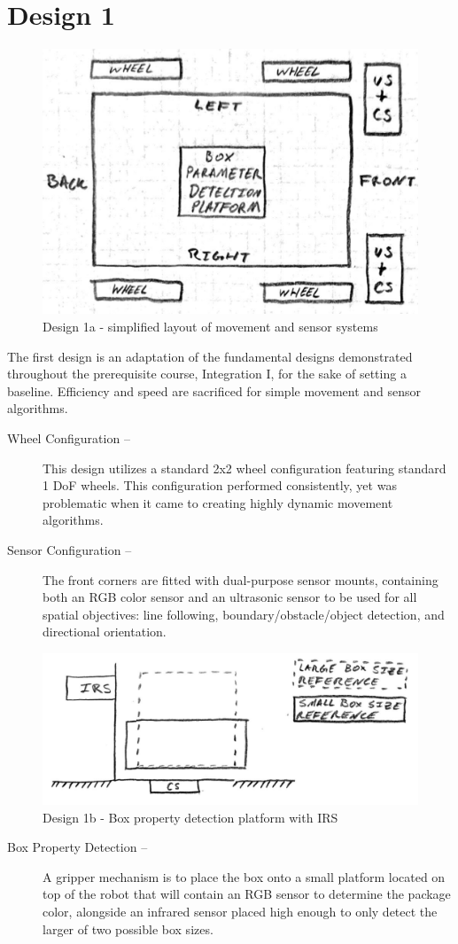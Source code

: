 \documentclass[11pt]{report}
\begin{document}
\section{Design 1}\label{sec:design1}
\begin{figure}[H]
    \centering
    \includegraphics[width=0.5\linewidth]{Images//Designs/Design1a.pdf}
    \caption{Design 1a - simplified layout of movement and sensor systems}
    \label{fig:design1a}
\end{figure}
The first design is an adaptation of the fundamental designs demonstrated throughout the prerequisite course, Integration I, for the sake of setting a baseline. Efficiency and speed are sacrificed for simple movement and sensor algorithms.

\begin{description}
    \item[Wheel Configuration --] This design utilizes a standard 2x2 wheel configuration featuring standard 1 \gls{DoF} wheels. This configuration performed consistently, yet was problematic when it came to creating highly dynamic movement algorithms.
    \item[Sensor Configuration --] The front corners are fitted with dual-purpose sensor mounts, containing both an \gls{RGB} color sensor and an ultrasonic sensor to be used for all spatial objectives: line following, boundary/obstacle/object detection, and directional orientation.
\end{description}

\begin{figure}[H]
    \centering
    \hspace*{6em}
    \includegraphics[width=0.6\linewidth]{Images//Designs/Design1b.pdf}
    \caption{Design 1b - Box property detection platform with \gls{IRS}}
    \label{fig:design1b}
\end{figure}
\begin{description}
    \item[Box Property Detection --]A gripper mechanism is to place the box onto a small platform located on top of the robot that will contain an \gls{RGB} sensor to determine the package color, alongside an infrared sensor placed high enough to only detect the larger of two possible box sizes.
\end{description}
\end{document}
